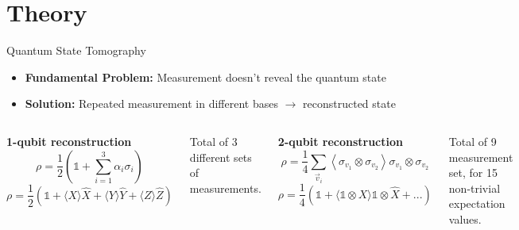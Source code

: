\section{Theory}

\begin{frame}{Quantum State Tomography}
  \begin{itemize}
  \item \textbf{Fundamental Problem:} Measurement doesn't reveal the quantum state
  \item \textbf{Solution:} Repeated measurement in different bases $\rightarrow$
      reconstructed state
  \end{itemize}
  \vspace{0.5cm}

  \begin{columns}
    \centering \textbf{1-qubit reconstruction}
      \begin{equation*}
        \rho=\frac{1}{2}\left(\mathbb{1}+\sum_{i=1}^3\alpha_i\sigma_i\right)
      \end{equation*}
      \begin{equation*}
        \rho=\frac{1}{2}\left(\mathbb{1}
          + \langle X \rangle \hat{X}
          + \langle Y \rangle \hat{Y}
          + \langle Z \rangle \hat{Z} \right)
      \end{equation*}

      \vspace{0.7cm}
      Total of 3 different sets of measurements.

    \centering \textbf{2-qubit reconstruction}
    \begin{equation*}
      \rho=\frac{1}{4}\sum_{\vec{v}_i}\left\langle\sigma_{v_1}
        \otimes\sigma_{v_2}\right\rangle\sigma_{v_1}\otimes\sigma_{v_2} 
    \end{equation*}
    \begin{equation*}
      \rho=\frac{1}{4}\left(\mathbb{1}
        + \langle \mathbb{1} \otimes X \rangle \mathbb{1} \otimes \hat{X} +
         ...\right)
    \end{equation*}

    \vspace{0.7cm}
    Total of 9 measurement set, for 15 non-trivial expectation values.

  \end{columns} 
\end{frame}



